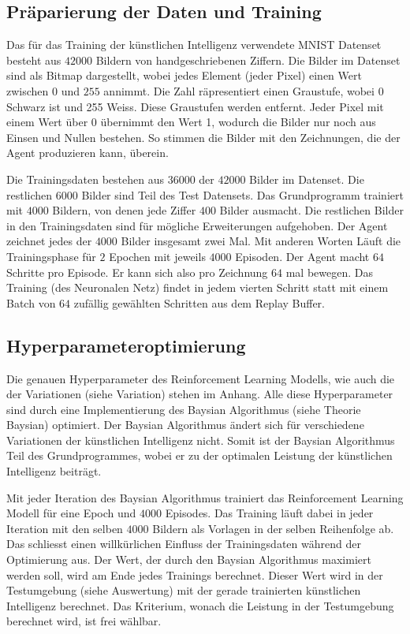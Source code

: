 \subsection{Präparierung der Daten und Training}
Das für das Training der künstlichen Intelligenz verwendete MNIST Datenset
besteht aus $42000$ Bildern von handgeschriebenen Ziffern. Die Bilder im
Datenset sind als Bitmap dargestellt, wobei jedes Element (jeder Pixel) einen
Wert zwischen $0$ und $255$ annimmt. Die Zahl räpresentiert einen Graustufe,
wobei 0 Schwarz ist und 255 Weiss. Diese Graustufen werden entfernt. Jeder Pixel
mit einem Wert über 0 übernimmt den Wert 1, wodurch die Bilder nur noch aus
Einsen und Nullen bestehen. So stimmen die Bilder mit den Zeichnungen, die der
Agent produzieren kann, überein.

Die Trainingsdaten bestehen aus $36000$ der $42000$ Bilder im Datenset. Die
restlichen $6000$ Bilder sind Teil des Test Datensets. Das Grundprogramm
trainiert mit $4000$ Bildern, von denen jede Ziffer $400$ Bilder ausmacht. Die
restlichen Bilder in den Trainingsdaten sind für mögliche Erweiterungen
aufgehoben. Der Agent zeichnet jedes der $4000$ Bilder insgesamt zwei Mal. Mit
anderen Worten Läuft die Trainingsphase für $2$ Epochen mit jeweils $4000$
Episoden. Der Agent macht $64$ Schritte pro Episode. Er kann sich also pro
Zeichnung $64$ mal bewegen. Das Training (des Neuronalen Netz) findet in jedem
vierten Schritt statt mit einem Batch von $64$ zufällig gewählten Schritten aus
dem Replay Buffer.

\subsection{Hyperparameteroptimierung}
\label{chap:Hyperparameter Optimierung}
Die genauen Hyperparameter des Reinforcement Learning Modells, wie auch die der     
Variationen (siehe Variation) stehen im Anhang. Alle diese Hyperparameter sind    %
durch eine Implementierung des Baysian Algorithmus \cite{fernando_bayesian_2022}
(siehe Theorie Baysian) optimiert. Der Baysian Algorithmus ändert sich für
verschiedene Variationen der künstlichen Intelligenz nicht. Somit ist der
Baysian Algorithmus Teil des Grundprogrammes, wobei er zu der optimalen Leistung
der künstlichen Intelligenz beiträgt. 

Mit jeder Iteration des Baysian Algorithmus trainiert das Reinforcement Learning
Modell für eine Epoch und $4000$ Episodes. Das Training läuft dabei in jeder
Iteration mit den selben $4000$ Bildern als Vorlagen in der selben Reihenfolge
ab. Das schliesst einen willkürlichen Einfluss der Trainingsdaten während der
Optimierung aus. Der Wert, der durch den Baysian Algorithmus maximiert werden
soll, wird am Ende jedes Trainings berechnet. Dieser Wert wird in der
Testumgebung (siehe Auswertung) mit der gerade trainierten künstlichen    %
Intelligenz berechnet. Das Kriterium, wonach die Leistung in der Testumgebung
berechnet wird, ist frei wählbar.



